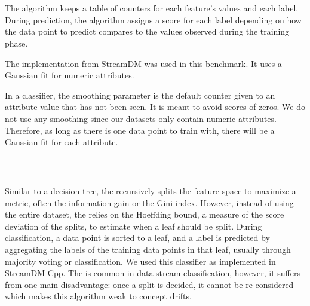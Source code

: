 \subsubsection{\naivebayes~\cite{naive_bayes}}
The \naivebayes algorithm keeps a table of
counters for each feature's values and each label.
During prediction, the algorithm assigns a
score for each label depending on how the data
point to predict compares to the values observed
during the training phase.

The implementation from StreamDM was used in this
benchmark. It uses a Gaussian
fit for numeric attributes.

In a \naivebayes classifier, the smoothing parameter is the
default counter given to an attribute value that
has not been seen. It is meant to avoid scores of zeros.
We do not use any smoothing since our datasets
only contain numeric
attributes. Therefore, as long as there is one data
point to train with, there will be a Gaussian
fit for each attribute.

\subsubsection{\hoeffdingtree~\cite{VFDT}}
Similar to a decision tree, the \hoeffdingtree
recursively splits the feature space to maximize a metric, often the
information gain or the Gini
index. However, instead of using the entire
dataset, the \hoeffdingtree relies on the
Hoeffding bound, a measure of the score deviation
of the splits, to estimate when a leaf should be
split. During classification, a data point
is sorted to a leaf, and a label is predicted by
aggregating the labels of the training data points
in that leaf, usually through majority voting or
\naivebayes classification.  We used this
classifier as implemented in StreamDM-Cpp.  The
\hoeffdingtree is common in data stream
classification, however, it suffers from one main
disadvantage: once a split is decided, it cannot
be re-considered which makes this algorithm weak
to concept drifts.

